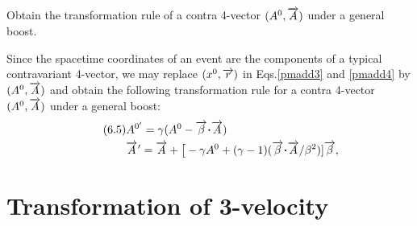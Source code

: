 \exm Obtain the transformation rule of a contra 
4-vector 
$(A^0,\overrightarrow{A})$ under a general boost. 

\soln Since the spacetime coordinates of an  event are 
the 
components of a typical contravariant 4-vector,  we 
may 
replace $(x^0,\overrightarrow{r})$ in Eqs.\eqref{pmadd3} and 
\eqref{pmadd4} by $(A^0,\overrightarrow{A})$ and obtain the 
following 
transformation rule for a contra 4-vector 
$(A^0,\overrightarrow{A})$ 
under a general boost:
\begin{align*}\tag{6.5}
&A^{0'}=\gkg(A^{0}-\veca{\gkb}\dotp\veca{A})\\
&\pvec{A}=\veca{A}+\big[-\gkg A^{0}
+(\gkg-1)(\veca{\gkb}\dotp\veca{A}/\gkb^2)]\veca{\gkb},
\end{align*}\ebx

\vspace{-.3cm}

\section{Transformation of 3-velocity}

